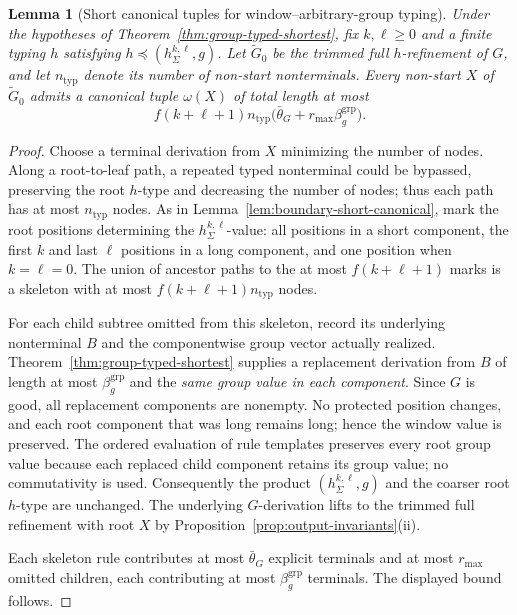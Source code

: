 \documentclass[11pt]{article}
\numberwithin{equation}{section}
\theoremstyle{plain}
\newtheorem{lemma}[theorem]{Lemma}
\theoremstyle{definition}
\theoremstyle{remark}
\theoremstyle{plain}
\begin{document}
\begin{lemma}[Short canonical tuples for window--arbitrary-group typing]
\label{lem:window-group-short}
Under the hypotheses of Theorem~\ref{thm:group-typed-shortest},
fix $k,\ell\ge0$ and a finite typing $h$ satisfying
$h\preceq(h_\Sigma^{k,\ell},g)$.
Let $\widetilde G_0$ be the trimmed full $h$-refinement
of $G$, and let $n_{\mathrm{typ}}$ denote its number of
non-start nonterminals.  Every non-start
$X$ of $\widetilde G_0$ admits a canonical tuple
$\omega(X)$ of total length at most
\[
 f(k+\ell+1)n_{\mathrm{typ}}
 \bigl(\bar\theta_G+r_{\max}\beta_g^{\mathrm{grp}}\bigr).
\]
\end{lemma}
\begin{proof}
Choose a terminal derivation from $X$ minimizing the
number of nodes.  Along a root-to-leaf path, a repeated
typed nonterminal could be bypassed, preserving the root
$h$-type and decreasing the number of nodes; thus
each path has at most $n_{\mathrm{typ}}$ nodes.
As in Lemma~\ref{lem:boundary-short-canonical},
mark the root positions determining the
$h_\Sigma^{k,\ell}$-value: all positions in a short
component, the first $k$ and last $\ell$ positions
in a long component, and one position when
$k=\ell=0$.  The union of ancestor paths to the
at most $f(k+\ell+1)$ marks is a skeleton with at most
$f(k+\ell+1)n_{\mathrm{typ}}$ nodes.

For each child subtree omitted from this skeleton,
record its underlying nonterminal $B$ and the
componentwise group vector actually realized.
Theorem~\ref{thm:group-typed-shortest} supplies
a replacement derivation from $B$ of length at most
$\beta_g^{\mathrm{grp}}$ and the \emph{same group
value in each component}.  Since $G$ is good,
all replacement components are nonempty.
No protected position changes, and each root
component that was long remains long; hence the
window value is preserved.  The ordered evaluation
of rule templates preserves every root group value
because each replaced child component retains its
group value; no commutativity is used.
Consequently the product $(h_\Sigma^{k,\ell},g)$
and the coarser root $h$-type are unchanged.
The underlying $G$-derivation lifts to the
trimmed full refinement with root $X$ by
Proposition~\ref{prop:output-invariants}(ii).

Each skeleton rule contributes at most
$\bar\theta_G$ explicit terminals and at most
$r_{\max}$ omitted children, each contributing at most
$\beta_g^{\mathrm{grp}}$ terminals.  The displayed
bound follows.
\end{proof}
\end{document}
